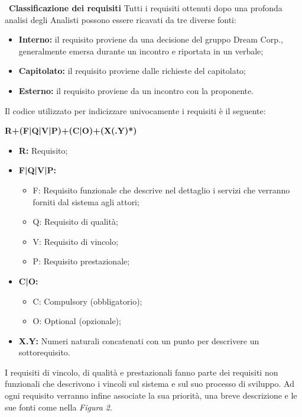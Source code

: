 	    ~\newline \textbf{Classificazione dei requisiti} Tutti i requisiti ottenuti dopo una profonda analisi degli Analisti possono essere ricavati da tre diverse fonti:\newline
	    \begin{itemize}
	    	\item \textbf{Interno:} il requisito proviene da una decisione del gruppo Dream Corp., generalmente emersa durante un incontro e riportata in un verbale;
	    	\item \textbf{Capitolato:} il requisito proviene dalle richieste del capitolato;
	    	\item \textbf{Esterno:} il requisito proviene da un incontro con la proponente.\newline
	    \end{itemize}
	    Il codice utilizzato per indicizzare univocamente i requisiti è il seguente:\newline
	    \begin{center}
	    	\textbf{R+(F|Q|V|P)+(C|O)+(X(.Y)*)}
	    \end{center}
	    \begin{itemize}
	    	\item \textbf{R:} Requisito;
	    	\item \textbf{F|Q|V|P:}
	    	\begin{itemize}
	    		\item F: Requisito funzionale che descrive nel dettaglio i servizi che verranno forniti dal sistema agli attori;
	    		\item Q: Requisito di qualità;
	    		\item V: Requisito di vincolo;
	    		\item P: Requisito prestazionale;
	    	\end{itemize}
	    	\item \textbf{C|O:}
	    	\begin{itemize}
	    		\item C: Compulsory (obbligatorio);
	    		\item O: Optional (opzionale);
	    	\end{itemize}
	    	\item \textbf{X.Y:} Numeri naturali concatenati con un punto per descrivere un sottorequisito.\newline
	    \end{itemize}
	    I requisiti di vincolo, di qualità e prestazionali fanno parte dei requisiti non funzionali che descrivono i vincoli sul sistema e sul suo processo di sviluppo.
	    Ad ogni requisito verranno infine associate la sua priorità, una breve descrizione e le sue fonti come nella \textit{Figura 2}.\newline
	    
